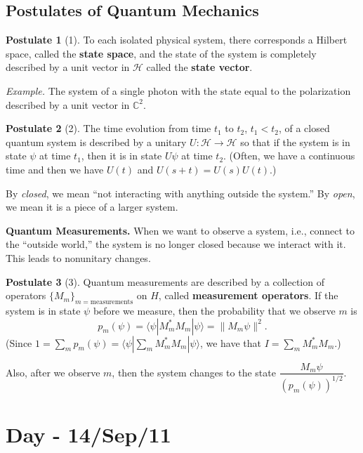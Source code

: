 \documentclass[12pt]{article}
\theoremstyle{definition}
\newtheorem*{postulate}{Postulate}
\newcommand{\norm}[1]{\|#1\|}
\newcommand{\C}{\mathbb{C}}
\begin{document}
\subsection{Postulates of Quantum Mechanics}

\begin{postulate}[1]
To each isolated physical system, there corresponds a Hilbert space, called the \textbf{state space}, and the state of the system is completely described by a unit vector in $\mathcal{H}$ called the \textbf{state vector}.

\textit{Example.} The system of a single photon with the state equal to the polarization described by a unit vector in $\C^2$.
\end{postulate}

\begin{postulate}[2]
The time evolution from time $t_1$ to $t_2$, $t_1 < t_2$, of a closed quantum system is described by a unitary $U : \mathcal{H} \to \mathcal{H}$ so that if the system is in state $\psi$ at time $t_1$, then it is in state $U\psi$ at time $t_2$. (Often, we have a continuous time and then we have $U(t)$ and $U(s+t) = U(s)U(t)$.)

By \emph{closed}, we mean ``not interacting with anything outside the system.'' By \emph{open}, we mean it is a piece of a larger system.
\end{postulate}

\textbf{Quantum Measurements.} When we want to observe a system, i.e., connect to the ``outside world,'' the system is no longer closed because we interact with it. This leads to nonunitary changes.

\begin{postulate}[3]
Quantum measurements are described by a collection of operators $\{M_m\}_{m=\text{measurements}}$ on $H$, called \textbf{measurement operators}. If the system is in state $\psi$ before we measure, then the probability that we observe $m$ is
\[
p_m(\psi) = \langle\psi|M_m^*M_m|\psi\rangle = \norm{M_m\psi}^2.
\]
(Since $1 = \sum_m p_m(\psi) = \langle\psi|\sum_m M_m^*M_m|\psi\rangle$, we have that $I = \sum_m M_m^*M_m$.)

Also, after we observe $m$, then the system changes to the state $\dfrac{M_m\psi}{(p_m(\psi))^{1/2}}$.
\end{postulate}

\section{Day - 14/Sep/11}
\end{document}
